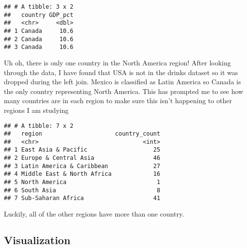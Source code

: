 \documentclass[]{article}
\newenvironment{Shaded}{\begin{snugshade}}{\end{snugshade}}
\newcommand{\KeywordTok}[1]{\textcolor[rgb]{0.13,0.29,0.53}{\textbf{#1}}}
\newcommand{\DataTypeTok}[1]{\textcolor[rgb]{0.13,0.29,0.53}{#1}}
\newcommand{\StringTok}[1]{\textcolor[rgb]{0.31,0.60,0.02}{#1}}
\newcommand{\OperatorTok}[1]{\textcolor[rgb]{0.81,0.36,0.00}{\textbf{#1}}}
\newcommand{\NormalTok}[1]{#1}
\begin{document}
\begin{Shaded}
\end{Shaded}

\begin{verbatim}
## # A tibble: 3 x 2
##   country GDP_pct
##   <chr>     <dbl>
## 1 Canada     10.6
## 2 Canada     10.6
## 3 Canada     10.6
\end{verbatim}

Uh oh, there is only one country in the North America region! After
looking through the data, I have found that USA is not in the drinks
dataset so it was dropped during the left join. Mexico is classified as
Latin America so Canada is the only country representing North America.
This has prompted me to see how many countries are in each region to
make sure this isn't happening to other regions I am studying

\begin{Shaded}
\end{Shaded}

\begin{verbatim}
## # A tibble: 7 x 2
##   region                     country_count
##   <chr>                              <int>
## 1 East Asia & Pacific                   25
## 2 Europe & Central Asia                 46
## 3 Latin America & Caribbean             27
## 4 Middle East & North Africa            16
## 5 North America                          1
## 6 South Asia                             8
## 7 Sub-Saharan Africa                    41
\end{verbatim}

Luckily, all of the other regions have more than one country.

\subsection{Visualization}\label{visualization}
\end{document}
